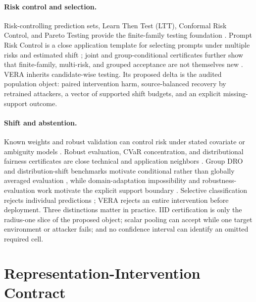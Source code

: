 \paragraph{Risk control and selection.}
Risk-controlling prediction sets, Learn Then Test (LTT), Conformal Risk Control,
and Pareto Testing provide the finite-family testing foundation
\cite{bates2021rcps,angelopoulos2025ltt,angelopoulos2024crc,laufer2023pareto}.
Prompt Risk Control is a close application template for selecting prompts under
multiple risks and estimated shift \cite{zollo2024prompt}; joint and
group-conditional certificates further show that finite-family, multi-risk,
and grouped acceptance are not themselves new
\cite{yu2026joint,huang2026conditional}. VERA inherits candidate-wise testing.
Its proposed delta is the audited population object: paired intervention harm,
source-balanced recovery by retrained attackers, a vector of supported shift
budgets, and an explicit missing-support outcome.

\paragraph{Shift and abstention.}
Known weights and robust validation can control risk under stated covariate or
ambiguity models
\cite{tibshirani2019covariate,almeida2025hprc,cauchois2024robust,ai2024finegrained}.
Robust evaluation, CVaR concentration, and distributional fairness
certificates are close technical and application neighbors
\cite{najafi2025federated,thomas2019cvar,kang2022certifying,ehyaei2025fragile}.
Group DRO and distribution-shift benchmarks motivate conditional rather than
globally averaged evaluation \cite{sagawa2020groupdro,koh2021wilds}, while
domain-adaptation impossibility and robustness-evaluation work motivate the
explicit support boundary \cite{bendavid2010impossibility,subbaswamy2021evaluation}.
Selective classification rejects individual predictions
\cite{elyaniv2010foundations,geifman2017selective,geifman2019selectivenet}; VERA
rejects an entire intervention before deployment. Three distinctions matter in
practice. IID certification is only the radius-one slice of the proposed
object; scalar pooling can accept while one target environment or attacker
fails; and no confidence interval can identify an omitted required cell.

\section{Representation-Intervention Contract}
\label{iclr:sec:contract}

